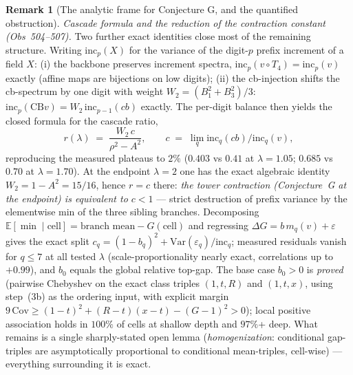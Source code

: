 \documentclass[11pt]{article}
\theoremstyle{definition}
\newtheorem{remark}[theorem]{Remark}
\begin{document}
\begin{remark}[The analytic frame for Conjecture G, and the quantified
obstruction]
\emph{Cascade formula and the reduction of the contraction constant (Obs~504--507).}
Two further exact identities close most of the remaining structure. Writing
$\mathrm{inc}_p(X)$ for the variance of the digit-$p$ prefix increment of a field $X$:
(i) the backbone preserves increment spectra, $\mathrm{inc}_p(v\circ T_4)=\mathrm{inc}_p(v)$
exactly (affine maps are bijections on low digits); (ii) the cb-injection shifts the
cb-spectrum by one digit with weight $W_2=(B_1^2{+}B_3^2)/3$:
$\mathrm{inc}_p(\mathrm{CB}v) = W_2\,\mathrm{inc}_{p-1}(cb)$ exactly. The per-digit balance
then yields the closed formula for the cascade ratio,
\[
  r(\lambda) \;=\; \frac{W_2\, c}{\rho^2 - A^2}, \qquad
  c \;=\; \lim_q \mathrm{inc}_q(cb)/\mathrm{inc}_q(v),
\]
reproducing the measured plateaus to $2\%$ ($0.403$ vs $0.41$ at $\lambda=1.05$; $0.685$
vs $0.70$ at $\lambda=1.70$). At the endpoint $\lambda=2$ one has the exact algebraic
identity $W_2 = 1-A^2 = 15/16$, hence $r=c$ there: \emph{the tower contraction
(Conjecture~G at the endpoint) is equivalent to $c<1$} — strict destruction of prefix
variance by the elementwise min of the three sibling branches. Decomposing
$\mathbb{E}[\min\mid\mathrm{cell}] = \text{branch mean} - G(\mathrm{cell})$ and regressing
$\Delta G = b\,m_q(v) + \varepsilon$ gives the exact split $c_q = (1-b_q)^2 +
\mathrm{Var}(\varepsilon_q)/\mathrm{inc}_q$; measured residuals vanish for $q\le 7$ at all
tested $\lambda$ (scale-proportionality nearly exact, correlations up to $+0.99$), and
$b_0$ equals the global relative top-gap. The base case $b_0>0$ is \emph{proved}
(pairwise Chebyshev on the exact class triples $(1,t,R)$ and $(1,t,x)$, using step~(3b)
as the ordering input, with explicit margin $9\,\mathrm{Cov} \ge (1-t)^2 + (R-t)(x-t)
- (G-1)^2 > 0$); local positive association holds in $100\%$ of cells at shallow depth
and $97\%$+ deep. What remains is a single sharply-stated open lemma
(\emph{homogenization}: conditional gap-triples are asymptotically proportional to
conditional mean-triples, cell-wise) — everything surrounding it is exact.
\end{remark}
\end{document}
